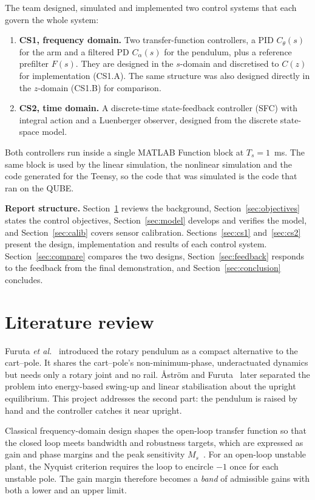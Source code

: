 \documentclass[11pt,a4paper]{article}
\begin{document}
The team designed, simulated and implemented two control systems that each
govern the whole system:
\begin{enumerate}[nosep]
\item \textbf{CS1, frequency domain.} Two transfer-function controllers,
  a PID $C_\theta(s)$ for the arm and a filtered PD $C_\alpha(s)$ for the
  pendulum, plus a reference prefilter $F(s)$. They are designed in the
  $s$-domain and discretised to $C(z)$ for implementation (CS1.A). The same
  structure was also designed directly in the $z$-domain (CS1.B) for
  comparison.
\item \textbf{CS2, time domain.} A discrete-time state-feedback controller
  (SFC) with integral action and a Luenberger observer, designed from the
  discrete state-space model.
\end{enumerate}
Both controllers run inside a single MATLAB Function block at
$T_s=1$~ms. The same block is used by the linear simulation, the
nonlinear simulation and the code generated for the Teensy, so the code
that was simulated is the code that ran on the QUBE.

\textbf{Report structure.} Section~\ref{sec:lit} reviews the background,
Section~\ref{sec:objectives} states the control objectives,
Section~\ref{sec:model} develops and verifies the model, and
Section~\ref{sec:calib} covers sensor calibration.
Sections~\ref{sec:cs1} and~\ref{sec:cs2} present the design,
implementation and results of each control system.
Section~\ref{sec:compare} compares the two designs,
Section~\ref{sec:feedback} responds to the feedback from the final
demonstration, and Section~\ref{sec:conclusion} concludes.

\section{Literature review}\label{sec:lit}
Furuta \emph{et al.}~\cite{furuta1992} introduced the rotary pendulum as
a compact alternative to the cart--pole. It shares the cart--pole's
non-minimum-phase, underactuated dynamics but needs only a rotary joint
and no rail. Åström and Furuta~\cite{astrom2000} later separated the
problem into energy-based swing-up and linear stabilisation about the
upright equilibrium. This project addresses the second part: the
pendulum is raised by hand and the controller catches it near upright.

Classical frequency-domain design shapes the open-loop transfer function
so that the closed loop meets bandwidth and robustness targets, which are
expressed as gain and phase margins and the peak sensitivity
$M_s$~\cite{franklin_feedback,ogata}. For an open-loop unstable plant, the
Nyquist criterion requires the loop to encircle $-1$ once for each
unstable pole. The gain margin therefore becomes a \emph{band} of
admissible gains with both a lower and an upper limit.
\end{document}
